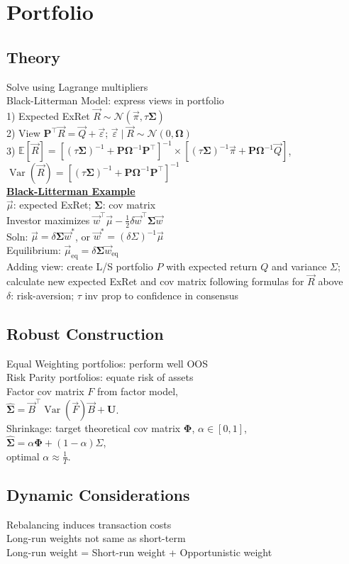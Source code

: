 \section{Portfolio}
	\subsection*{Theory}
	Solve using Lagrange multipliers\\
	Black-Litterman Model: express views in portfolio\\
	1) Expected ExRet $\vec{R}\sim\mathcal{N}\left(\vec{\pi}, \tau\mathbf{\Sigma}\right)$\\
	2) View $\mathbf{P}^{\intercal}\vec{R} = \vec{Q} + \vec{\varepsilon}$; $\vec{\varepsilon}\mid\vec{R}\sim\mathcal{N}\left(0, \mathbf{\Omega}\right)$\\
	3) $\mathbb{E}\left[\vec{R}\right] = \left[\left(\tau\mathbf{\Sigma}\right)^{-1} + \mathbf{P}\mathbf{\Omega}^{-1}\mathbf{P}^{\intercal}\right]^{-1}\times\left[\left(\tau\mathbf{\Sigma}\right)^{-1}\vec{\pi} + \mathbf{P}\mathbf{\Omega}^{-1}\vec{Q}\right]$,\\ $\operatorname{Var}\left(\vec{R}\right) = \left[\left(\tau\mathbf{\Sigma}\right)^{-1} + \mathbf{P}\mathbf{\Omega}^{-1}\mathbf{P}^{\intercal}\right]^{-1}$\\
	\underline{\textbf{Black-Litterman Example}}\\
	$\vec{\mu}$: expected ExRet; $\mathbf{\Sigma}$: cov matrix\\
	Investor maximizes $\vec{w}^{\intercal}\vec{\mu} - \frac{1}{2}\delta\vec{w}^{\intercal}\mathbf{\Sigma}\vec{w}$\\
	Soln: $\vec{\mu} = \delta\mathbf{\Sigma}\vec{w}^{\ast}$, or $\vec{w}^{\ast} = \left(\delta\Sigma\right)^{-1}\vec{\mu}$\\
	Equilibrium: $\vec{\mu}_{\text{eq}} = \delta\mathbf{\Sigma}\vec{w}_{\text{eq}}$\\
	Adding view: create L/S portfolio $P$ with expected return $Q$ and variance $\Sigma$; calculate new expected ExRet and cov matrix following formulas for $\vec{R}$ above\\
	$\delta$: risk-aversion; $\tau$ inv prop to confidence in consensus
	
	\subsection*{Robust Construction}
	Equal Weighting portfolios: perform well OOS\\
	Risk Parity portfolios: equate risk of assets\\
	Factor cov matrix $F$ from factor model,\\
	$\hat{\mathbf{\Sigma}} = \vec{B}^{\intercal}\operatorname{Var}\left(\vec{F}\right)\vec{B} + \mathbf{U}$.\\
	Shrinkage: target theoretical cov matrix $\mathbf{\Phi}$, $\alpha\in\left[0, 1\right]$,\\
	$\hat{\mathbf{\Sigma}} = \alpha\mathbf{\Phi} + \left(1 - \alpha\right)\Sigma$,\\
	optimal $\alpha\approx\frac{1}{T}$.
	
	\subsection*{Dynamic Considerations}
	Rebalancing induces transaction costs\\
	Long-run weights not same as short-term\\
	Long-run weight = Short-run weight + Opportunistic weight
	